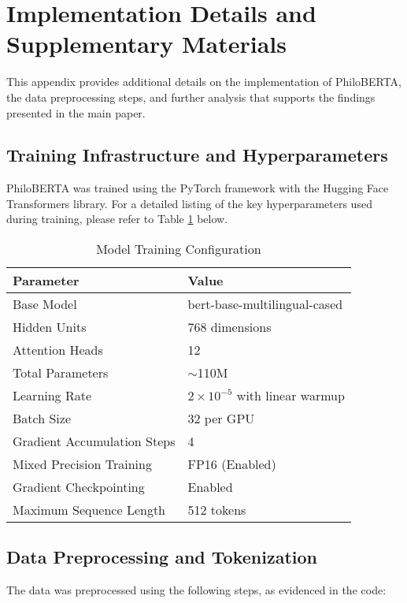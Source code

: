\documentclass[11pt]{article} %
\begin{document}



\appendix
\section{Implementation Details and Supplementary Materials}

This appendix provides additional details on the implementation of PhiloBERTA, the data preprocessing steps, and further analysis that supports the findings presented in the main paper.

\subsection{Training Infrastructure and Hyperparameters}

PhiloBERTA was trained using the PyTorch framework with the Hugging Face Transformers library. For a detailed listing of the key hyperparameters used during training, please refer to Table \ref{tab:model_config} below.

\begin{table}[htbp]
\centering
\caption{Model Training Configuration}
\label{tab:model_config}
\begin{tabular}{ll}
\toprule
\textbf{Parameter} & \textbf{Value} \\
\midrule
Base Model & bert-base-multilingual-cased \\
Hidden Units & 768 dimensions \\
Attention Heads & 12 \\
Total Parameters & $\sim$110M \\
Learning Rate & $2 \times 10^{-5}$ with linear warmup \\
Batch Size & 32 per GPU \\
Gradient Accumulation Steps & 4 \\
Mixed Precision Training & FP16 (Enabled) \\
Gradient Checkpointing & Enabled \\
Maximum Sequence Length & 512 tokens \\
\bottomrule
\end{tabular}
\end{table}

\subsection{Data Preprocessing and Tokenization}

The data was preprocessed using the following steps, as evidenced in the code:
\end{document}
